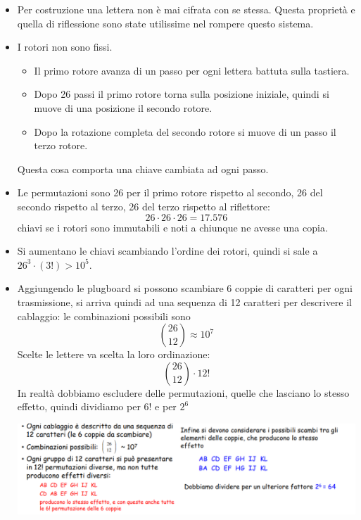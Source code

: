 \begin{itemize}
	\item Per costruzione una lettera non è mai cifrata con se stessa. Questa proprietà e quella di riflessione sono state utilissime nel rompere questo sistema.
	\item I rotori non sono fissi.
	\begin{itemize}
		\item Il primo rotore avanza di un passo per ogni lettera battuta sulla tastiera.
		\item Dopo 26 passi il primo rotore torna sulla posizione iniziale, quindi si muove di una posizione il secondo rotore.
		\item Dopo la rotazione completa del secondo rotore si muove di un passo il terzo rotore.
	\end{itemize}
	Questa cosa comporta una chiave cambiata ad ogni passo.
	\item Le permutazioni sono 26 per il primo rotore rispetto al secondo, 26 del secondo rispetto al terzo, 26 del terzo rispetto al riflettore: $$26 \cdot 26 \cdot 26 = 17.576$$ chiavi se i rotori sono immutabili e noti a chiunque ne avesse una copia. 
	\item Si aumentano le chiavi scambiando l'ordine dei rotori, quindi si sale a ${26}^3 \cdot \left(3!\right) > 10^5$.
	\item Aggiungendo le plugboard si possono scambiare 6 coppie di caratteri per ogni trasmissione, si arriva quindi ad una sequenza di 12 caratteri per descrivere il cablaggio: le combinazioni possibili sono $$\binom{26}{12} \approx 10^7$$ Scelte le lettere va scelta la loro ordinazione: 
	$$\binom{26}{12} \cdot 12!$$
	In realtà dobbiamo escludere delle permutazioni, quelle che lasciano lo stesso effetto, quindi dividiamo per $6!$ e per $2^6$
	\begin{center}
		\includegraphics[scale=.75]{images/26.PNG}
	\end{center}
\end{itemize}

